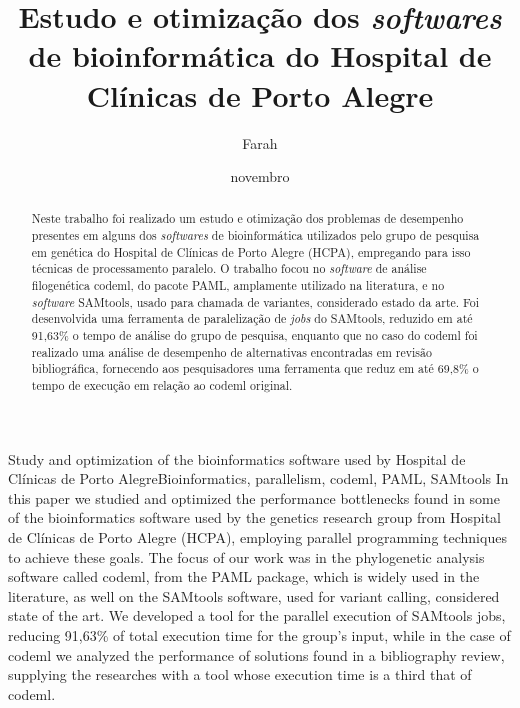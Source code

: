 \documentclass[cic,tc]{iiufrgs}
\title{Estudo e otimização dos \textit{softwares} de bioinformática do Hospital de
Clínicas de Porto Alegre}
\author{Farah}{Alef}
\date{novembro}{2021}
\begin{document}
\maketitle



\begin{abstract}
  Neste trabalho foi realizado um estudo e otimização dos problemas de
  desempenho presentes em alguns dos \textit{softwares} de bioinformática utilizados
  pelo grupo de pesquisa em genética do Hospital de Clínicas de Porto Alegre
  (HCPA), empregando para isso técnicas de processamento paralelo. O trabalho
  focou no \textit{software} de análise filogenética codeml, do pacote PAML, amplamente
  utilizado na literatura, e no \textit{software} SAMtools, usado para chamada de
  variantes, considerado estado da arte. Foi desenvolvida uma ferramenta de
  paralelização de \textit{jobs} do SAMtools, reduzido em até 91,63\% o tempo
  de análise do grupo de pesquisa, enquanto que no caso do codeml foi realizado
  uma análise de desempenho de alternativas encontradas em revisão
  bibliográfica, fornecendo aos pesquisadores uma ferramenta que reduz em até
  69,8\% o tempo de execução em relação ao codeml original.  
\end{abstract}

\begin{englishabstract}{Study and optimization of the bioinformatics software used by Hospital de Clínicas de Porto Alegre}{Bioinformatics, parallelism, codeml, PAML, SAMtools} In this paper we studied and optimized the performance bottlenecks found in some of the bioinformatics software used by the genetics research group from Hospital de Clínicas de Porto Alegre (HCPA), employing parallel programming techniques to achieve these goals. The focus of our work was in the phylogenetic analysis software called codeml, from the PAML package, which is widely used in the literature, as well on the SAMtools software, used for variant calling, considered state of the art. We developed a tool for the parallel execution of SAMtools jobs, reducing 91,63\% of total execution time for the group's input, while in the case of codeml we analyzed the performance of solutions found in a bibliography review, supplying the researches with a tool whose execution time is a third that of codeml.
\end{englishabstract}
\end{document}
